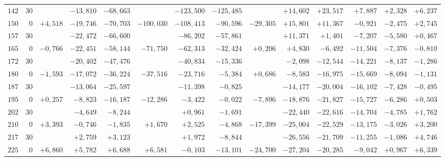 \begin{landscape}
\begin{longtable}{@{}rr|r|r|r|r|r|r|r|r|r|r|r|r@{}}
\(142\) & \(30\) &  & \(-13{,}810\) & \(-68{,}663\) &  & \(-123{,}500\) & \(-125{,}485\) &  & \(+14{,}602\) & \(+23{,}517\) & \(+7{,}887\) & \(+2{,}328\) & \(+6{,}237\)\\[2pt]
\(150\) & \(0\) & \(+4{,}518\) & \(-19{,}746\) & \(-70{,}703\) & \(-100{,}030\) & \(-108{,}413\) & \(-90{,}596\) & \(-29{,}305\) & \(+15{,}801\) & \(+11{,}367\) & \(-0{,}921\) & \(-2{,}475\) & \(+2{,}745\)\\
\(157\) & \(30\) &  & \(-22{,}472\) & \(-66{,}600\) &  & \(-86{,}202\) & \(-57{,}861\) &  & \(+11{,}371\) & \(+1{,}401\) & \(-7{,}207\) & \(-5{,}580\) & \(+0{,}467\)\\
\(165\) & \(0\) & \(-0{,}766\) & \(-22{,}451\) & \(-58{,}144\) & \(-71{,}750\) & \(-62{,}313\) & \(-32{,}424\) & \(+0{,}206\) & \(+4{,}830\) & \(-6{,}492\) & \(-11{,}504\) & \(-7{,}376\) & \(-0{,}810\)\\
\(172\) & \(30\) &  & \(-20{,}402\) & \(-47{,}476\) &  & \(-40{,}834\) & \(-15{,}336\) &  & \(-2{,}098\) & \(-12{,}544\) & \(-14{,}221\) & \(-8{,}137\) & \(-1{,}286\)\\[2pt]
\(180\) & \(0\) & \(-1{,}593\) & \(-17{,}072\) & \(-36{,}224\) & \(-37{,}516\) & \(-23{,}716\) & \(-5{,}384\) & \(+0{,}686\) & \(-8{,}583\) & \(-16{,}975\) & \(-15{,}669\) & \(-8{,}094\) & \(-1{,}131\)\\
\(187\) & \(30\) &  & \(-13{,}064\) & \(-25{,}597\) &  & \(-11{,}398\) & \(-0{,}825\) &  & \(-14{,}177\) & \(-20{,}004\) & \(-16{,}102\) & \(-7{,}428\) & \(-0{,}495\)\\
\(195\) & \(0\) & \(+0{,}257\) & \(-8{,}823\) & \(-16{,}187\) & \(-12{,}286\) & \(-3{,}422\) & \(-0{,}022\) & \(-7{,}896\) & \(-18{,}876\) & \(-21{,}827\) & \(-15{,}727\) & \(-6{,}286\) & \(+0{,}503\)\\
\(202\) & \(30\) &  & \(-4{,}649\) & \(-8{,}244\) &  & \(+0{,}961\) & \(-1{,}691\) &  & \(-22{,}440\) & \(-22{,}616\) & \(-14{,}704\) & \(-4{,}785\) & \(+1{,}762\)\\[2pt]
\(210\) & \(0\) & \(+3{,}393\) & \(-0{,}746\) & \(-1{,}835\) & \(+1{,}670\) & \(+2{,}525\) & \(-4{,}868\) & \(-17{,}399\) & \(-25{,}004\) & \(-22{,}529\) & \(-13{,}175\) & \(-3{,}026\) & \(+3{,}200\)\\
\(217\) & \(30\) &  & \(+2{,}759\) & \(+3{,}123\) &  & \(+1{,}972\) & \(-8{,}844\) &  & \(-26{,}556\) & \(-21{,}709\) & \(-11{,}255\) & \(-1{,}086\) & \(+4{,}746\)\\
\(225\) & \(0\) & \(+6{,}860\) & \(+5{,}782\) & \(+6{,}688\) & \(+6{,}581\) & \(-0{,}103\) & \(-13{,}101\) & \(-24{,}700\) & \(-27{,}204\) & \(-20{,}285\) & \(-9{,}042\) & \(+0{,}967\) & \(+6{,}339\)\\

\end{longtable}
\end{landscape}
